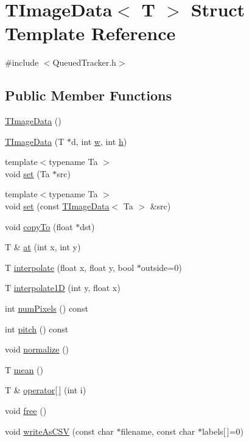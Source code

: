 \hypertarget{struct_t_image_data}{}\section{T\+Image\+Data$<$ T $>$ Struct Template Reference}
\label{struct_t_image_data}


{\ttfamily \#include $<$Queued\+Tracker.\+h$>$}

\subsection*{Public Member Functions}
\begin{DoxyCompactItemize}
\item 
\hyperlink{struct_t_image_data_ab452fff333ec33dfd813202aab9c83b5}{T\+Image\+Data} ()
\item 
\hyperlink{struct_t_image_data_ac988f01fb11de12f34721e76e25b5513}{T\+Image\+Data} (T $\ast$d, int \hyperlink{struct_t_image_data_aa46faa6f66f9d6f93c65e14aea643eb3}{w}, int \hyperlink{struct_t_image_data_a252235d07e487e8d02908aed062147bd}{h})
\item 
{\footnotesize template$<$typename Ta $>$ }\\void \hyperlink{struct_t_image_data_a92b0f42f80923c2e2539b509b44d150f}{set} (Ta $\ast$src)
\item 
{\footnotesize template$<$typename Ta $>$ }\\void \hyperlink{struct_t_image_data_afa44d16ecad563302e14bd79bede5ce1}{set} (const \hyperlink{struct_t_image_data}{T\+Image\+Data}$<$ Ta $>$ \&src)
\item 
void \hyperlink{struct_t_image_data_a59e49f2c23986fde59baccd287e1328c}{copy\+To} (float $\ast$dst)
\item 
T \& \hyperlink{struct_t_image_data_ad13c1527ffabe17b997c38090ec5e6b9}{at} (int x, int y)
\item 
T \hyperlink{struct_t_image_data_ac92ac7641d694ac8842bbf4b186ad49a}{interpolate} (float x, float y, bool $\ast$outside=0)
\item 
T \hyperlink{struct_t_image_data_adf096e9a5565d9949c10dd8f3aa31a14}{interpolate1D} (int y, float x)
\item 
int \hyperlink{struct_t_image_data_a778a4b0170c0a225b89692c7cedd2440}{num\+Pixels} () const 
\item 
int \hyperlink{struct_t_image_data_aef0a87643a69b40e19ba11590d51318d}{pitch} () const 
\item 
void \hyperlink{struct_t_image_data_ac987182fb87787d7d274a30cf4a198d4}{normalize} ()
\item 
T \hyperlink{struct_t_image_data_a3b6f4073306aa6f7f819b270196b9bae}{mean} ()
\item 
T \& \hyperlink{struct_t_image_data_a2f381200e0a64cbcbe04d83790dd96ba}{operator\mbox{[}$\,$\mbox{]}} (int i)
\item 
void \hyperlink{struct_t_image_data_a60a60e309657216a2e35809fdc582b11}{free} ()
\item 
void \hyperlink{struct_t_image_data_aa324cc320e1a5b2d8f42ae56a197dca9}{write\+As\+C\+SV} (const char $\ast$filename, const char $\ast$labels\mbox{[}$\,$\mbox{]}=0)
\end{DoxyCompactItemize}
